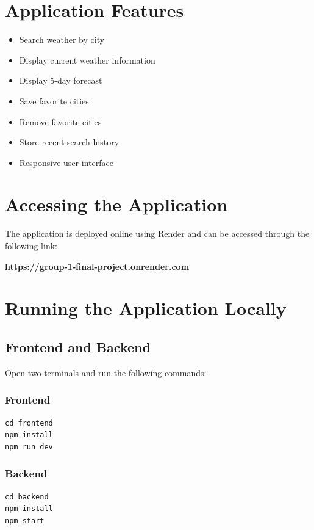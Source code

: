 \documentclass[12pt]{article}
\begin{document}
\section{Application Features}

\begin{itemize}
    \item Search weather by city
    \item Display current weather information
    \item Display 5-day forecast
    \item Save favorite cities
    \item Remove favorite cities
    \item Store recent search history
    \item Responsive user interface
\end{itemize}

\section{Accessing the Application}

The application is deployed online using Render and can be accessed through the following link:

\textbf{https://group-1-final-project.onrender.com}

\section{Running the Application Locally}

\subsection{Frontend and Backend}

Open two terminals and run the following commands:

\subsubsection*{Frontend}

\begin{verbatim}
cd frontend
npm install
npm run dev
\end{verbatim}

\subsubsection*{Backend}

\begin{verbatim}
cd backend
npm install
npm start
\end{verbatim}
\end{document}
